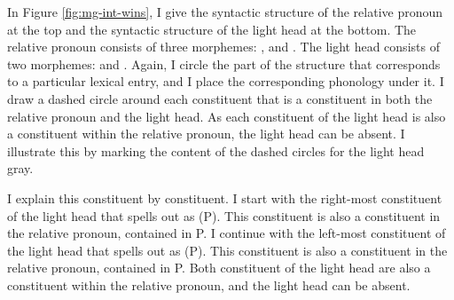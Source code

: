 In Figure \ref{fig:mg-int-wins}, I give the syntactic structure of the relative pronoun at the top and the syntactic structure of the light head at the bottom.
The relative pronoun consists of three morphemes: ,  and .
The light head consists of two morphemes:  and .
Again, I circle the part of the structure that corresponds to a particular lexical entry, and I place the corresponding phonology under it.
I draw a dashed circle around each constituent that is a constituent in both the relative pronoun and the light head.
As each constituent of the light head is also a constituent within the relative pronoun, the light head can be absent. I illustrate this by marking the content of the dashed circles for the light head gray.

I explain this constituent by constituent.
I start with the right-most constituent of the light head that spells out as  (P). This constituent is also a constituent in the relative pronoun, contained in P.
I continue with the left-most constituent of the light head that spells out as  (P). This constituent is also a constituent in the relative pronoun, contained in P.
Both constituent of the light head are also a constituent within the relative pronoun, and the light head can be absent.

